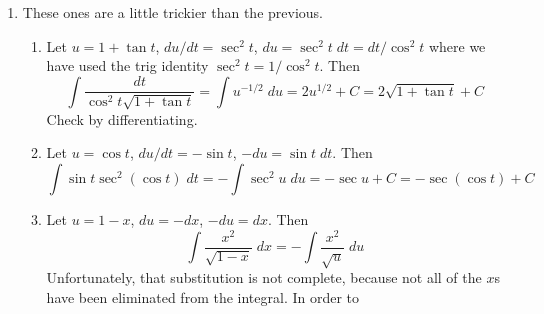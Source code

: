\documentclass{article}
\begin{document}
\begin{enumerate}
\item These ones are a little trickier than the previous.
  \begin{enumerate}
  \item Let $u=1+\tan t$, $du/dt = \sec^2 t$, $du = \sec^2 t \; dt =
    dt/\cos^2 t$ where we have used the trig identity $\sec^2 t =
    1/\cos^2 t$.  Then
    \begin{equation*}
      \int \frac{dt}{\cos^2t \sqrt{1+\tan t}}
      = \int u^{-1/2} \; du
      = 2 u^{1/2} + C
      = 2 \sqrt{1+\tan t} + C
    \end{equation*}
    Check by differentiating.
  \item Let $u=\cos t$, $du/dt = -\sin t$, $-du = \sin t\; dt$.  Then
    \begin{equation*}
      \int \sin t \sec^2(\cos t) \; dt
      = -\int \sec^2 u \; du
      = -\sec u + C
      = -\sec(\cos t) + C
    \end{equation*}
  \item Let $u=1-x$, $du = -dx$, $-du = dx$.  Then
    \begin{equation*}
      \int \frac{x^2}{\sqrt{1-x}} \; dx
      = -\int \frac{x^2}{\sqrt{u}} \; du
    \end{equation*}
    Unfortunately, that substitution is not complete, because not all
    of the $x$s have been eliminated from the integral.  In order to

\end{enumerate}
\end{enumerate}
\end{document}
